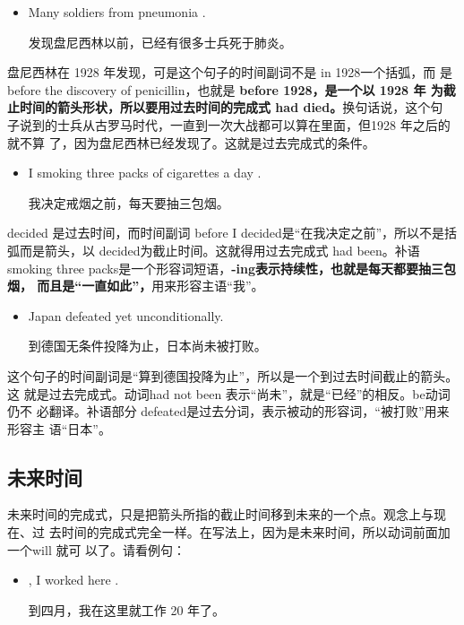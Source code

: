 \begin{itemize}
\item  Many soldiers  from pneumonia .

  发现盘尼西林以前，已经有很多士兵死于肺炎。
\end{itemize}

盘尼西林在 1928 年发现，可是这个句子的时间副词不是 in 1928一个括弧，而
是 before the discovery of penicillin，也就是 \textbf{before 1928，是一个以 1928 年
  为截止时间的箭头形状，所以要用过去时间的完成式 had died。}换句话说，这个句
子说到的士兵从古罗马时代，一直到一次大战都可以算在里面，但1928 年之后的就不算
了，因为盘尼西林已经发现了。这就是过去完成式的条件。

\begin{itemize}
\item  I  smoking three packs of cigarettes a day .

  我决定戒烟之前，每天要抽三包烟。
\end{itemize}

decided 是过去时间，而时间副词 before I decided是“在我决定之前”，所以不是括
弧而是箭头，以 decided为截止时间。这就得用过去完成式 had been。补语 smoking
three packs是一个形容词短语，\textbf{-ing表示持续性，也就是每天都要抽三包烟，
  而且是“一直如此”，}用来形容主语“我”。


\begin{itemize}
\item  Japan  defeated yet  unconditionally.

  到德国无条件投降为止，日本尚未被打败。
\end{itemize}

这个句子的时间副词是“算到德国投降为止”，所以是一个到过去时间截止的箭头。这
就是过去完成式。动词had not been 表示“尚未”，就是“已经”的相反。be动词仍不
必翻译。补语部分 defeated是过去分词，表示被动的形容词，“被打败”用来形容主
语“日本”。

\subsection{未来时间}

未来时间的完成式，只是把箭头所指的截止时间移到未来的一个点。观念上与现在、过
去时间的完成式完全一样。在写法上，因为是未来时间，所以动词前面加一个will 就可
以了。请看例句：

\begin{itemize}
\item  {}, I  worked here .

  到四月，我在这里就工作 20 年了。
\end{itemize}

